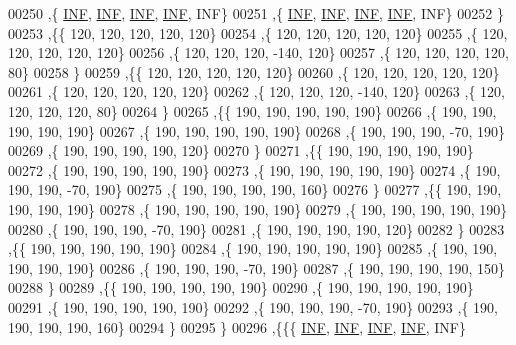 \begin{DoxyCode}
00250   ,\{   \hyperlink{energy__const_8h_a12c2040f25d8e3a7b9e1c2024c618cb6}{INF},   \hyperlink{energy__const_8h_a12c2040f25d8e3a7b9e1c2024c618cb6}{INF},   \hyperlink{energy__const_8h_a12c2040f25d8e3a7b9e1c2024c618cb6}{INF},   \hyperlink{energy__const_8h_a12c2040f25d8e3a7b9e1c2024c618cb6}{INF},   INF\}
00251   ,\{   \hyperlink{energy__const_8h_a12c2040f25d8e3a7b9e1c2024c618cb6}{INF},   \hyperlink{energy__const_8h_a12c2040f25d8e3a7b9e1c2024c618cb6}{INF},   \hyperlink{energy__const_8h_a12c2040f25d8e3a7b9e1c2024c618cb6}{INF},   \hyperlink{energy__const_8h_a12c2040f25d8e3a7b9e1c2024c618cb6}{INF},   INF\}
00252   \}
00253  ,\{\{   120,   120,   120,   120,   120\}
00254   ,\{   120,   120,   120,   120,   120\}
00255   ,\{   120,   120,   120,   120,   120\}
00256   ,\{   120,   120,   120,  -140,   120\}
00257   ,\{   120,   120,   120,   120,    80\}
00258   \}
00259  ,\{\{   120,   120,   120,   120,   120\}
00260   ,\{   120,   120,   120,   120,   120\}
00261   ,\{   120,   120,   120,   120,   120\}
00262   ,\{   120,   120,   120,  -140,   120\}
00263   ,\{   120,   120,   120,   120,    80\}
00264   \}
00265  ,\{\{   190,   190,   190,   190,   190\}
00266   ,\{   190,   190,   190,   190,   190\}
00267   ,\{   190,   190,   190,   190,   190\}
00268   ,\{   190,   190,   190,   -70,   190\}
00269   ,\{   190,   190,   190,   190,   120\}
00270   \}
00271  ,\{\{   190,   190,   190,   190,   190\}
00272   ,\{   190,   190,   190,   190,   190\}
00273   ,\{   190,   190,   190,   190,   190\}
00274   ,\{   190,   190,   190,   -70,   190\}
00275   ,\{   190,   190,   190,   190,   160\}
00276   \}
00277  ,\{\{   190,   190,   190,   190,   190\}
00278   ,\{   190,   190,   190,   190,   190\}
00279   ,\{   190,   190,   190,   190,   190\}
00280   ,\{   190,   190,   190,   -70,   190\}
00281   ,\{   190,   190,   190,   190,   120\}
00282   \}
00283  ,\{\{   190,   190,   190,   190,   190\}
00284   ,\{   190,   190,   190,   190,   190\}
00285   ,\{   190,   190,   190,   190,   190\}
00286   ,\{   190,   190,   190,   -70,   190\}
00287   ,\{   190,   190,   190,   190,   150\}
00288   \}
00289  ,\{\{   190,   190,   190,   190,   190\}
00290   ,\{   190,   190,   190,   190,   190\}
00291   ,\{   190,   190,   190,   190,   190\}
00292   ,\{   190,   190,   190,   -70,   190\}
00293   ,\{   190,   190,   190,   190,   160\}
00294   \}
00295  \}
00296 ,\{\{\{   \hyperlink{energy__const_8h_a12c2040f25d8e3a7b9e1c2024c618cb6}{INF},   \hyperlink{energy__const_8h_a12c2040f25d8e3a7b9e1c2024c618cb6}{INF},   \hyperlink{energy__const_8h_a12c2040f25d8e3a7b9e1c2024c618cb6}{INF},   \hyperlink{energy__const_8h_a12c2040f25d8e3a7b9e1c2024c618cb6}{INF},   INF\}

\end{DoxyCode}
